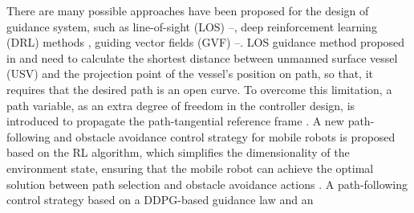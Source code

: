 \documentclass[a4paper, 10pt, conference]{ieeeconf}      %
\begin{document}
There are many possible approaches have been proposed for the design of guidance system, such as line-of-sight (LOS) \cite{c4}--\cite{c7}, deep reinforcement learning (DRL) methods \cite{c8,c9}, guiding vector fields (GVF) \cite{c10}--\cite{c12}. LOS guidance method proposed in \cite{c4} and \cite{c5} need to calculate the shortest distance between unmanned surface vessel (USV) and the projection point of the vessel's position on path, so that, it requires that the desired path is an open curve. To overcome this limitation, a path variable, as an extra degree of freedom in the controller design, is introduced to propagate the path-tangential reference frame \cite{c6,c7}.  A new path-following and obstacle avoidance control strategy for mobile robots is proposed based on the RL algorithm, which simplifies the dimensionality of the environment state, ensuring that the mobile robot can achieve the optimal solution between path selection and obstacle avoidance actions \cite{c8}. A path-following
control strategy based on a DDPG-based guidance law and an
\end{document}

